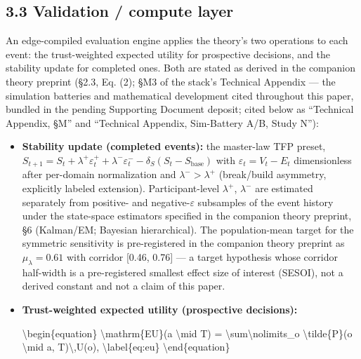 \documentclass[
]{article}
\newenvironment{Shaded}{}{}
\newcommand{\NormalTok}[1]{#1}
\begin{document}
\subsection{3.3 Validation / compute
layer}\label{validation-compute-layer}

An edge-compiled evaluation engine applies the theory's two operations
to each event: the trust-weighted expected utility for prospective
decisions, and the stability update for completed ones. Both are stated
as derived in the companion theory preprint (§2.3, Eq. (2); §M3 of the
stack's Technical Appendix --- the simulation batteries and mathematical
development cited throughout this paper, bundled in the pending
Supporting Document deposit; cited below as ``Technical Appendix, §M''
and ``Technical Appendix, Sim-Battery A/B, Study N''):

\begin{itemize}
\item
  \textbf{Stability update (completed events):} the master-law TFP
  preset,
  \(S_{t+1} = S_t + \lambda^{+}\varepsilon_t^{+} + \lambda^{-}\varepsilon_t^{-} - \delta_S(S_t - S_{\mathrm{base}})\)
  with \(\varepsilon_t = V_t - E_t\) dimensionless after per-domain
  normalization and \(\lambda^{-} > \lambda^{+}\) (break/build
  asymmetry, explicitly labeled extension). Participant-level
  \(\lambda^{+}\), \(\lambda^{-}\) are estimated separately from
  positive- and negative-\(\varepsilon\) subsamples of the event history
  under the state-space estimators specified in the companion theory
  preprint, §6 (Kalman/EM; Bayesian hierarchical). The population-mean
  target for the symmetric sensitivity is pre-registered in the
  companion theory preprint as \(\mu_{\lambda} = 0.61\) with corridor
  {[}0.46, 0.76{]} --- a target hypothesis whose corridor half-width is
  a pre-registered smallest effect size of interest (SESOI), not a
  derived constant and not a claim of this paper.
\item
  \textbf{Trust-weighted expected utility (prospective decisions):}

\begin{Shaded}
\begin{Highlighting}[]
\NormalTok{\textbackslash{}begin\{equation\}}
\NormalTok{ \textbackslash{}mathrm\{EU\}(a \textbackslash{}mid T) = \textbackslash{}sum\textbackslash{}nolimits\_o \textbackslash{}tilde\{P\}(o \textbackslash{}mid a, T)\textbackslash{},U(o), \textbackslash{}label\{eq:eu\}}
\NormalTok{\textbackslash{}end\{equation\}}
\end{Highlighting}
\end{Shaded}


\end{itemize}
\end{document}
